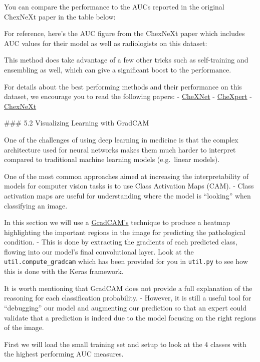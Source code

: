 \documentclass[11pt]{article}
\begin{document}
    You can compare the performance to the AUCs reported in the original
ChexNeXt paper in the table below:

    For reference, here's the AUC figure from the ChexNeXt paper which
includes AUC values for their model as well as radiologists on this
dataset:

This method does take advantage of a few other tricks such as
self-training and ensembling as well, which can give a significant boost
to the performance.

    For details about the best performing methods and their performance on
this dataset, we encourage you to read the following papers: -
\href{https://arxiv.org/abs/1711.05225}{CheXNet} -
\href{https://arxiv.org/pdf/1901.07031.pdf}{CheXpert} -
\href{https://journals.plos.org/plosmedicine/article?id=10.1371/journal.pmed.1002686}{ChexNeXt}

     \#\#\# 5.2 Visualizing Learning with GradCAM

    One of the challenges of using deep learning in medicine is that the
complex architecture used for neural networks makes them much harder to
interpret compared to traditional machine learning models (e.g.~linear
models).

One of the most common approaches aimed at increasing the
interpretability of models for computer vision tasks is to use Class
Activation Maps (CAM). - Class activation maps are useful for
understanding where the model is ``looking'' when classifying an image.

In this section we will use a
\href{https://arxiv.org/abs/1610.02391}{GradCAM's} technique to produce
a heatmap highlighting the important regions in the image for predicting
the pathological condition. - This is done by extracting the gradients
of each predicted class, flowing into our model's final convolutional
layer. Look at the \texttt{util.compute\_gradcam} which has been
provided for you in \texttt{util.py} to see how this is done with the
Keras framework.

It is worth mentioning that GradCAM does not provide a full explanation
of the reasoning for each classification probability. - However, it is
still a useful tool for ``debugging'' our model and augmenting our
prediction so that an expert could validate that a prediction is indeed
due to the model focusing on the right regions of the image.

    First we will load the small training set and setup to look at the 4
classes with the highest performing AUC measures.
\end{document}
